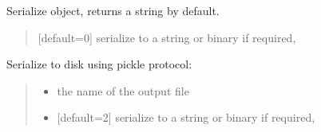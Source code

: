 \documentclass[letterpaper,12pt,english]{sphinxmanual}
\begin{document}
\begin{fulllineitems}
\begin{fulllineitems}
\end{fulllineitems}


\begin{fulllineitems}
\label{\detokenize{api/core:cbmpy.CBModel.Group.serialize}}
\pysigstartsignatures
\pysiglinewithargsret
{}
{}
{}
\pysigstopsignatures
\sphinxAtStartPar
Serialize object, returns a string by default.
\begin{quote}\begin{description}
\sphinxAtStartPar
{} \textendash{} {[}default=0{]} serialize to a string or binary if required,

\end{description}\end{quote}

\end{fulllineitems}


\begin{fulllineitems}
\label{\detokenize{api/core:cbmpy.CBModel.Group.serializeToDisk}}
\pysigstartsignatures
\pysiglinewithargsret
{}
{\sphinxparamcomma {}}
{}
\pysigstopsignatures
\sphinxAtStartPar
Serialize to disk using pickle protocol:
\begin{quote}\begin{description}
\begin{itemize}
\item {} 
\sphinxAtStartPar
{} \textendash{} the name of the output file

\item {} 
\sphinxAtStartPar
{} \textendash{} {[}default=2{]} serialize to a string or binary if required,

\end{itemize}

\end{description}\end{quote}

\end{fulllineitems}


\end{fulllineitems}
\end{document}
